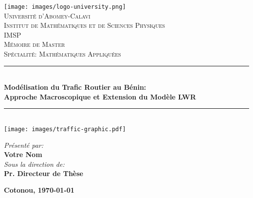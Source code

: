 \begin{titlepage}
\thispagestyle{empty}
\pagecolor{white} %

\begin{center}

\vspace*{-1cm}
\texttt{[image: images/logo-university.png]}\\[0.5cm]

\textsc{\Large Université d'Abomey-Calavi}\\[0.3cm]
\textsc{\large Institut de Mathématiques et de Sciences Physiques}\\[0.2cm]
\textsc{\large IMSP}\\[1.5cm]

\textsc{\large Mémoire de Master}\\
\textsc{\normalsize Spécialité: Mathématiques Appliquées}\\[2cm]

{\color{darkblue}\rule{\textwidth}{1.5pt}}\\[0.45cm]
{\LARGE\bfseries\color{darkblue}Modélisation du Trafic Routier au Bénin:\\[0.2cm]
\large Approche Macroscopique et Extension du Modèle LWR}\\[0.45cm]
{\color{darkblue}\rule{\textwidth}{1.5pt}}\\[1.5cm]

\texttt{[image: images/traffic-graphic.pdf]}\\[1.2cm]

\begin{flushright}
\large
\emph{Présenté par:}\\
\textbf{Votre Nom}\\[1cm]
\emph{Sous la direction de:}\\
\textbf{Pr. Directeur de Thèse}\\
\end{flushright}

\vfill

{\large\bfseries Cotonou, \today}

\end{center}
\end{titlepage}
\pagecolor{pagebackground} %
